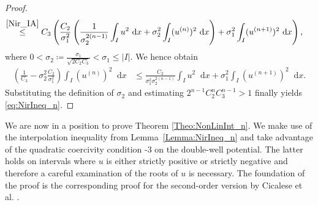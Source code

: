 \documentclass{article}
\newcommand{\dd}{\mathop{}\mathrm{d}} %
\numberwithin{figure}{section}
\numberwithin{equation}{section}
\begin{document}
\begin{proof}
\begin{align}
        & \hspace{-0.138cm} \overset{\eqref{Nir_IA}}{\leq} C_3 \left( \frac {C_2}{\sigma_1^2} \left(\frac {1}{\sigma_2^{2(n-1)}} \int_I u^2\dd x + \sigma_2^2 \int_I (u^{(n)})^2\dd x\right) + \sigma_1^2 \int_I (u^{(n+1)})^2\dd x\right),
    \end{align}
    where $0 < \sigma_2 \coloneq  \frac{\sigma_1}{\sqrt{2C_2C_3}} < \sigma_1 \leq |I|$. We hence obtain
    \begin{align}
        \left(\frac 1{C_3} - \sigma_2^2 \frac{C_2}{\sigma_1^2} \right) \int_I (u^{(n)})^2\dd x 
        & \leq \frac {C_2}{\sigma_1^2\sigma_2^{2(n-1)}} \int_I u^2\dd x + \sigma_1^2 \int_I (u^{(n+1)})^2\dd x.
    \end{align}
    Substituting the definition of $\sigma_2$ and estimating  $2^{n-1}C_2^nC_3^{n-1}>1$ finally yields \eqref{eq:NirIneq_n}.
\end{proof}

 We are now in a position to prove Theorem \ref{Theo:NonLinInt_n}. We make use of the interpolation inequality from Lemma~\ref{Lemma:NirIneq_n} and take advantage of the quadratic coercivity condition \hyp3 on the double-well potential. The latter holds on intervals where $u$ is either strictly positive or strictly negative and therefore a careful examination of the roots of $u$ is necessary. The foundation of the proof is the corresponding proof for the second-order version by Cicalese et al. \cite{CicSpaZep}.
\end{document}
